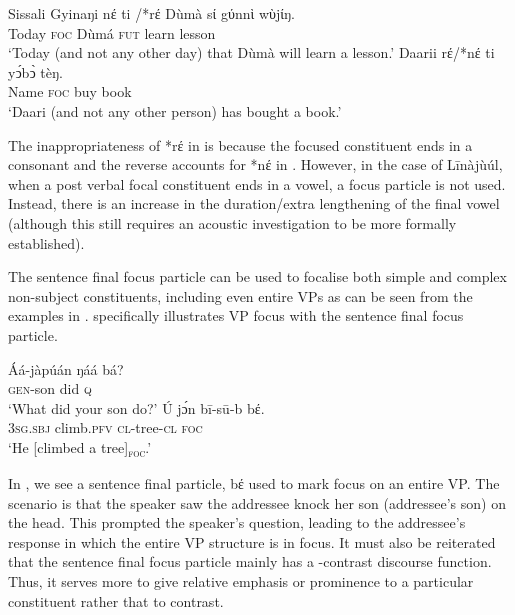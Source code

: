 \documentclass[output=paper,colorlinks,citecolor=brown]{langscibook}
\begin{document}
\ea%
    \label{ex:bisilki:18}
    Sissali \citep[84]{Dumah2017}
    \ea\label{ex:bisilki:18a}
    \gll    Gyinaŋi	nέ ti /*rέ	Dùmà		sί	gύnnὶ wὺjίŋ.\\
            Today		\textsc{foc} {} {}		Dùmá 		\textsc{fut} 	 learn 	        lesson\\
    \glt    ‘Today (and not any other day) that Dùmà will learn a lesson.’
    \ex\label{ex:bisilki:18b}
    \gll    Daarii		rέ/*nέ ti	yↄ́bↄ̀	 tèŋ.\\
            Name		\textsc{foc} {}		buy	book\\
    \glt    ‘Daari (and not any other person) has bought a book.’
    \z
\z

The inappropriateness of *rέ in  is because the focused constituent ends in a consonant and the reverse accounts for *nέ in . However, in the case of Līnàjùúl, when a post verbal focal constituent ends in a vowel, a focus particle is not used. Instead, there is an increase in the duration/extra lengthening of the final vowel (although this still requires an acoustic investigation to be more formally established).

The sentence final focus particle can be used to focalise both simple and complex non-subject constituents, including even entire VPs as can be seen from the examples in .  specifically illustrates VP focus with the sentence final focus particle.

\ea%
    \label{ex:bisilki:19}
    \ea\label{ex:bisilki:19a}
    \gll    Áá-jàpúán	ŋáá	bá?\\
            \textsc{gen-}son	did	\textsc{q}\\
    \glt    ‘What did your son do?’
    \ex\label{ex:bisilki:19b}
    \gll    Ú		jɔ́n		bī-sū-b	bέ.\\
            \textsc{3sg.sbj}	climb\textsc{.pfv}	\textsc{cl-}tree\textsc{-cl}	\textsc{foc}\\
    \glt    ‘He [climbed a tree]\textsubscript{\textsc{foc}}.’
    \z
\z

In , we see a sentence final particle, bέ used to mark focus on an entire VP. The scenario is that the speaker  saw the addressee  knock her son (addressee’s son) on the head. This prompted the speaker’s question, leading to the addressee’s response  in which the entire VP structure is in focus. It must also be reiterated that the sentence final focus particle mainly has a -contrast discourse function. Thus, it serves more to give relative emphasis or prominence to a particular constituent rather that to contrast.
\end{document}
